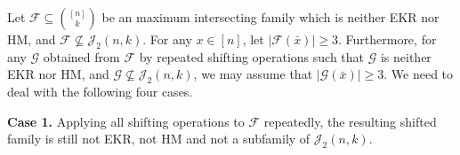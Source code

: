 \documentclass[11pt]{article}
\numberwithin{equation}{section}
\newtheorem{prop}[theorem]{Proposition}
\begin{document}

 
Let $\mathcal{F} \subseteq\binom{[n]}{k}$ be an maximum intersecting family which is neither EKR nor HM, and $\mathcal{F} \nsubseteq \mathcal{J}_2(n, k)$. For any $x \in[n]$, let $|\mathcal{F}(\bar{x})|\geq 3$. Furthermore, 
for any $\mathcal{G}$ obtained from $\mathcal{F}$ by repeated shifting operations such that $\mathcal{G}$  is neither EKR nor HM, and  $\mathcal{G} \nsubseteq \mathcal{J}_2(n, k)$, we may assume that $|\mathcal{G}(\bar{x})|\geq 3$. We need to deal with the following four cases.

{\bf Case 1.} Applying all shifting operations to $\mathcal{F}$ repeatedly, the resulting shifted family is still not EKR, not HM and not a subfamily of $\mathcal{J}_2(n, k)$. 
\end{document}
